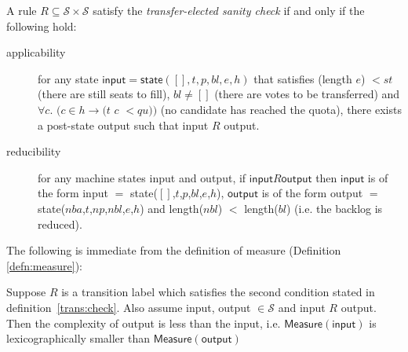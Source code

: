 \documentclass{llncs}
\begin{document}
\begin{definition}\label{trans:check}
A rule $R \subseteq \mathcal{S} \times \mathcal{S}$ satisfy the
\emph{transfer-elected sanity check}  if and only if the following
hold:
\begin{description}
\item[applicability] for any state 
$\mathsf{input} = \mathsf{state}([],t,p,bl,e,h)$ that satisfies 
(\textsf{length} $e$) $< st$  (there are still seats to fill), $bl
\neq []$ (there are votes to be transferred) and 
$\forall c.$ $(c \in h \rightarrow (t$ $c$ $< qu))$  (no candidate
has reached the quota), there exists a post-state 
\textsf{output} such that \textsf{input} $R$ \textsf{output}.
\item[reducibility] for any machine states \textsf{input} and
\textsf{output}, if $\mathsf{input} R \mathsf{output}$ then
$\mathsf{input}$ is of the form 
 \textsf{input} $=$
\textsf{state}($[]$,$t$,$p$,$bl$,$e$,$h$), $\mathsf{output}$ is of
the form \textsf{output} $=$
\textsf{state}($nba$,$t$,$np$,$nbl$,$e$,$h$) and \textsf{length}($nbl$)
$<$ \textsf{length}($bl$) (i.e. the backlog is reduced). 
\end{description}
\end{definition}

\noindent
The following is immediate from the definition of measure
(Definition \ref{defn:measure}):
\begin{theorem}\label{trans:red}
Suppose $R$ is a transition label which satisfies the second
condition stated in definition~\ref{trans:check}. Also assume
\textsf{input}, \textsf{output} $\in\mathcal{S}$ and \textsf{input}
$R$ \textsf{output}. Then the complexity of \textsf{output} is less
than the \textsf{input}, i.e. $\mathsf{Measure}(\mathsf{input})$ is
lexicographically smaller than $\mathsf{Measure}(\mathsf{output})$
\end{theorem}
\end{document}
